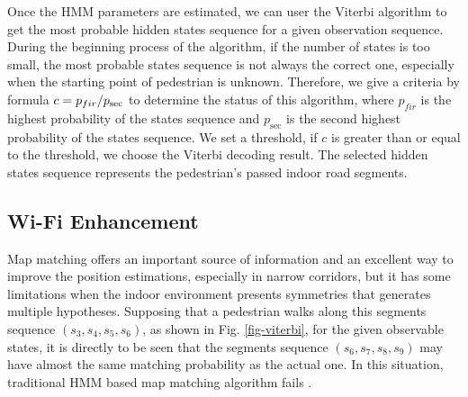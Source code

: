 \documentclass{llncs}
\begin{document}
Once the HMM parameters are estimated, we can user the Viterbi algorithm to get the most probable hidden states sequence for a given observation sequence. During the beginning process of the algorithm, if the number of states is too small, the most probable states sequence is not always the correct one, especially when the starting point of pedestrian is unknown. Therefore, we give a criteria by formula $c = {{{p_{fir}}} \mathord{\left/
		{\vphantom {{{p_{fir}}} {{p_{\sec }}}}} \right.
\kern-\nulldelimiterspace} {{p_{\sec }}}}$ to determine the status of this algorithm, where ${p_{fir}}$ is the highest probability of the states sequence and ${p_{\sec }}$ is the second highest probability of the states sequence. We set a threshold, if $c$ is greater than or equal to the threshold, we choose the Viterbi decoding result. The selected hidden states sequence represents the pedestrian's passed indoor road segments.

\subsection{Wi-Fi Enhancement}
Map matching offers an important source of information and an excellent way to improve the position estimations, especially in narrow corridors, but it has some limitations when the indoor environment presents symmetries that generates multiple hypotheses. Supposing that a pedestrian walks along this segments sequence $(s_3, s_4, s_5, s_6)$, as shown in Fig. \ref{fig-viterbi}, for the given observable states, it is directly to be seen that the segments sequence $(s_6, s_7, s_8, s_9)$ may have almost the same matching probability as the actual one. In this situation, traditional HMM based map matching algorithm fails \cite{zhou2015activity}.
\end{document}
